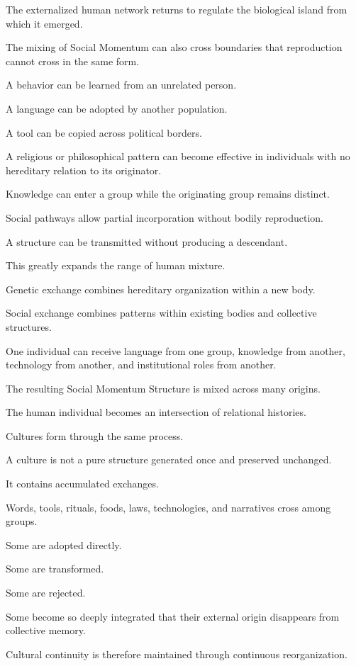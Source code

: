 The externalized human network returns to regulate the biological island from which it emerged.

The mixing of Social Momentum can also cross boundaries that reproduction cannot cross in the same form.

A behavior can be learned from an unrelated person.

A language can be adopted by another population.

A tool can be copied across political borders.

A religious or philosophical pattern can become effective in individuals with no hereditary relation to its originator.

Knowledge can enter a group while the originating group remains distinct.

Social pathways allow partial incorporation without bodily reproduction.

A structure can be transmitted without producing a descendant.

This greatly expands the range of human mixture.

Genetic exchange combines hereditary organization within a new body.

Social exchange combines patterns within existing bodies and collective structures.

One individual can receive language from one group, knowledge from another, technology from another, and institutional roles from another.

The resulting Social Momentum Structure is mixed across many origins.

The human individual becomes an intersection of relational histories.

Cultures form through the same process.

A culture is not a pure structure generated once and preserved unchanged.

It contains accumulated exchanges.

Words, tools, rituals, foods, laws, technologies, and narratives cross among groups.

Some are adopted directly.

Some are transformed.

Some are rejected.

Some become so deeply integrated that their external origin disappears from collective memory.

Cultural continuity is therefore maintained through continuous reorganization.

